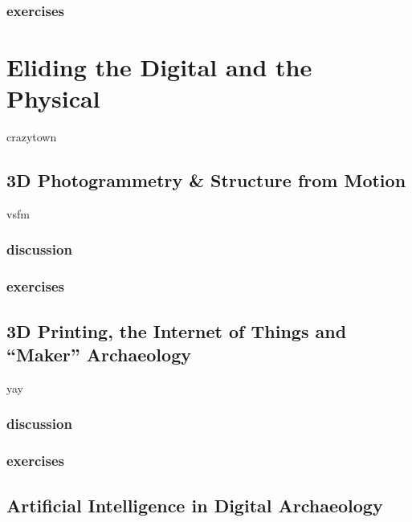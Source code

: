 \documentclass[english,]{book}
\begin{document}
\subsection{exercises}\label{exercises-15}

\chapter{Eliding the Digital and the
Physical}\label{eliding-the-digital-and-the-physical}

crazytown

\section{3D Photogrammetry \& Structure from
Motion}\label{d-photogrammetry-structure-from-motion}

vsfm

\subsection{discussion}\label{discussion-11}

\subsection{exercises}\label{exercises-16}

\section{\texorpdfstring{3D Printing, the Internet of Things and
``Maker''
Archaeology}{3D Printing, the Internet of Things and Maker Archaeology}}\label{d-printing-the-internet-of-things-and-maker-archaeology}

yay

\subsection{discussion}\label{discussion-12}

\subsection{exercises}\label{exercises-17}

\section{Artificial Intelligence in Digital
Archaeology}\label{artificial-intelligence-in-digital-archaeology}
\end{document}
